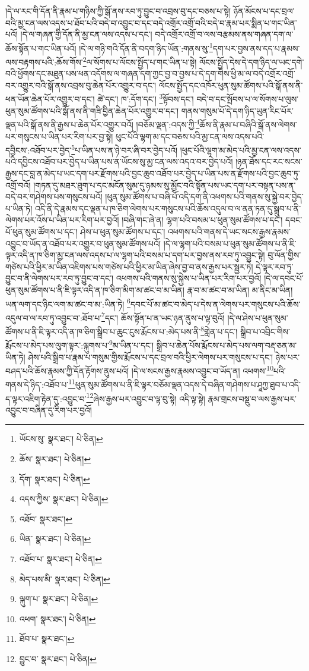 །དེ་ལ་རང་གི་དོན་ནི་རྣམ་པ་གཉིས་ཀྱི་སྒོ་ནས་རབ་ཏུ་བྱུང་བ་འབྲས་བུ་དང་བཅས་པ་སྟེ། ཉོན་མོངས་པ་དང་བྲལ་བའི་མྱ་ངན་ལས་འདས་པ་ཐོབ་པའི་བདེ་བ་འབྱུང་བ་དང་བདེ་འགྲོར་འགྲོ་བའི་བདེ་བ་རྣམ་པར་སྨིན་པ་གང་ཡིན་པའོ། །དེ་ལ་གཞན་གྱི་དོན་ནི་མྱ་ངན་ལས་འདས་པ་དང་། བདེ་འགྲོར་འགྲོ་བ་ལས་བརྩམས་ནས་གཞན་དག་ལ་ཆོས་སྟོན་པ་གང་ཡིན་པའོ། །དེ་ལ་གཉི་གའི་དོན་ནི་བདག་ཉིད་ཡོན་:གནས་སུ་\footnote{ཡོངས་སུ་  སྣར་ཐང་།  པེ་ཅིན། }དག་པར་བྱས་ནས་དད་པ་རྣམས་ལས་བརྟགས་པའི་:ཆོས་གོས་\footnote{ཆོས་  སྣར་ཐང་།  པེ་ཅིན། }ལ་སོགས་པ་ལོངས་སྤྱོད་པ་གང་ཡིན་པ་སྟེ། ལོངས་སྤྱོད་དེས་དེ་དག་ཉིད་ལ་ཡང་དགེ་བའི་ཕྱོགས་དང་མཐུན་པས་ཕན་འདོགས་ལ་གཞན་དག་ཀྱང་བྱ་བ་བྱས་པ་དེ་དག་གིས་ཕྱི་མ་ལ་བདེ་འགྲོར་འགྲོ་བར་འགྱུར་བའི་སྒོ་ནས་འབྲས་བུ་ཆེན་པོར་འགྱུར་བ་དང་། ལོངས་སྤྱོད་དང་འཁོར་ཕུན་སུམ་ཚོགས་པའི་སྒོ་ནས་ནི་ཕན་ཡོན་ཆེན་པོར་འགྱུར་བ་དང་། ཚེ་དང་། ཁ་:དོག་དང་། \footnote{དོག་  སྣར་ཐང་།  པེ་ཅིན། }སྟོབས་དང་། བདེ་བ་དང་སྤོབས་པ་ལ་སོགས་པ་ལུས་ཕུན་སུམ་ཚོགས་པའི་སྒོ་ནས་ནི་གཟི་བྱིན་ཆེན་པོར་འགྱུར་བ་དང་། གནས་གསུམ་པོ་དེ་དག་ཉིད་ཡུན་རིང་པོར་ལྡན་པའི་སྒོ་ནས་ནི་རྒྱས་པ་ཆེན་པོར་འགྱུར་བའོ། །བཅོམ་ལྡན་:འདས་ཀྱི་\footnote{འདས་ཀྱིས་  སྣར་ཐང་།  པེ་ཅིན། }ཆོས་ནི་རྣམ་པ་བཞིའི་སྒོ་ནས་ལེགས་པར་གསུངས་པ་ཡིན་པར་རིག་པར་བྱ་སྟེ། ཕུང་པོའི་ལྷག་མ་དང་བཅས་པའི་མྱ་ངན་ལས་འདས་པའི་དབྱིངས་:འཐོབ་པར་བྱེད་\footnote{འཐོབ་  སྣར་ཐང་། }པ་ཡིན་པས་ན་ཉེ་བར་ཞི་བར་བྱེད་པའོ། །ཕུང་པོའི་ལྷག་མ་མེད་པའི་མྱ་ངན་ལས་འདས་པའི་དབྱིངས་འཐོབ་པར་བྱེད་པ་ཡིན་པས་ན་ཡོངས་སུ་མྱ་ངན་ལས་འདའ་བར་བྱེད་པའོ། །ཉན་ཐོས་དང་རང་སངས་རྒྱས་དང་བླ་ན་མེད་པ་ཡང་དག་པར་རྫོགས་པའི་བྱང་ཆུབ་འཐོབ་པར་བྱེད་པ་ཡིན་པས་ན་རྫོགས་པའི་བྱང་ཆུབ་ཏུ་འགྲོ་བའོ། །གཏན་དུ་མཐར་ཐུག་པ་དང་མངོན་སུམ་དུ་ཉམས་སུ་མྱོང་བའི་སྟོན་པས་ཡང་དག་པར་བསྟན་པས་ན་བདེ་བར་གཤེགས་པས་གསུངས་པའོ། །ཕུན་སུམ་ཚོགས་པ་བཞི་པོ་འདི་དག་ནི་འཕགས་པའི་གནས་སུ་སྐྱེ་བར་བྱེད་པ་ཡིན་ཏེ། འདི་ནི་དེ་རྣམས་དང་ལྡན་པ་ཁ་ཅིག་ལེགས་པར་གསུངས་པའི་ཆོས་འདུལ་བ་ལ་ནན་ཏན་དུ་སྒྲུབ་པ་ནི་ལེགས་པར་འོས་པ་ཡིན་པར་རིག་པར་བྱའོ། །བཞི་གང་ཞེ་ན། ལྷག་པའི་བསམ་པ་ཕུན་སུམ་ཚོགས་པ་དང་། དབང་པོ་ཕུན་སུམ་ཚོགས་པ་དང་། ཤེས་པ་ཕུན་སུམ་ཚོགས་པ་དང་། འཕགས་པའི་གནས་དེ་ཡང་སངས་རྒྱས་རྣམས་འབྱུང་བ་ཡོད་ན་འཐོབ་པར་འགྱུར་བ་ཕུན་སུམ་ཚོགས་པའོ། །དེ་ལ་ལྷག་པའི་བསམ་པ་ཕུན་སུམ་ཚོགས་པ་ནི་ཇི་ལྟར་འདི་ན་ཁ་ཅིག་མྱ་ངན་ལས་འདས་པ་ལ་ལྷག་པའི་བསམ་པ་དག་པར་བྱས་ནས་རབ་ཏུ་འབྱུང་སྟེ། བུ་ལོན་གྱིས་གཙེས་པའི་ཕྱིར་མ་ཡིན་འཇིགས་པས་གཙེས་པའི་ཕྱིར་མ་ཡིན་ཞེས་བྱ་བ་ནས་རྒྱས་པར་སྦྱར་ཏེ། དེ་ལྟར་རབ་ཏུ་བྱུང་བ་ནི་ལེགས་པར་རབ་ཏུ་བྱུང་བ་དང་། འཕགས་པའི་གནས་སུ་སྐྱེས་པ་ཡིན་པར་རིག་པར་བྱའོ། །དེ་ལ་དབང་པོ་ཕུན་སུམ་ཚོགས་པ་ནི་ཇི་ལྟར་འདི་ན་ཁ་ཅིག་མིག་མ་ཚང་བ་མ་ཡིན། རྣ་བ་མ་ཚང་བ་མ་ཡིན། མ་ནིང་མ་ཡིན། ཡན་ལག་དང་ཉིང་ལག་མ་ཚང་བ་མ་:ཡིན་ཏེ། \footnote{ཡིན་  སྣར་ཐང་།  པེ་ཅིན། }དབང་པོ་མ་ཚང་བ་མེད་པ་དེས་ན་ལེགས་པར་གསུངས་པའི་ཆོས་འདུལ་བ་ལ་རབ་ཏུ་འབྱུང་བ་:ཐོབ་པ་\footnote{འཐོབ་པ་  སྣར་ཐང་།  པེ་ཅིན། }དང་། ཆོས་སྟོན་པ་ན་ཡང་ཉན་ནུས་པ་ལྟ་བུའོ། །དེ་ལ་ཤེས་པ་ཕུན་སུམ་ཚོགས་པ་ནི་ཇི་ལྟར་འདི་ན་ཁ་ཅིག་སྒྲིབ་པ་ཆུང་ངུས་རྨོངས་པ་:མེད་པས་ནི་\footnote{མེད་པས་མི་  སྣར་ཐང་།  པེ་ཅིན། }གླེན་པ་དང་། སྒྲིབ་པ་འབྲིང་གིས་རྨོངས་པ་མེད་པས་ལུག་ལྟར་:ལྐུགས་པ་\footnote{ལྐུག་པ་  སྣར་ཐང་།  པེ་ཅིན། }མ་ཡིན་པ་དང་། སྒྲིབ་པ་ཆེན་པོས་རྨོངས་པ་མེད་པས་ལག་བརྡ་ཅན་མ་ཡིན་ཏེ། ཤེས་པའི་སྒྲིབ་པ་རྣམ་པ་གསུམ་གྱིས་རྨོངས་པ་དང་བྲལ་བའི་ཕྱིར་ལེགས་པར་གསུངས་པ་དང་། ཉེས་པར་བཤད་པའི་ཆོས་རྣམས་ཀྱི་དོན་རྟོགས་ནུས་པའོ། །དེ་ལ་སངས་རྒྱས་རྣམས་འབྱུང་བ་ཡོད་ན། འཕགས་\footnote{འཕག་  སྣར་ཐང་།  པེ་ཅིན། }པའི་གནས་དེ་ཉིད་:འཐོབ་པ་\footnote{ཐོབ་པ་  སྣར་ཐང་། }ཕུན་སུམ་ཚོགས་པ་ནི་ཇི་ལྟར་བཅོམ་ལྡན་འདས་དེ་བཞིན་གཤེགས་པ་ཤཱཀྱ་ཐུབ་པ་འདི་ད་ལྟར་འཇིག་རྟེན་དུ་:འབྱུང་བ་\footnote{བྱུང་བ་  སྣར་ཐང་།  པེ་ཅིན། }ཞེས་རྒྱས་པར་འབྱུང་བ་ལྟ་བུ་སྟེ། འདི་ལྟ་སྟེ། རྣམ་གྲངས་བསྡུ་བ་ལས་རྒྱས་པར་འབྱུང་བ་བཞིན་དུ་རིག་པར་བྱའོ། 